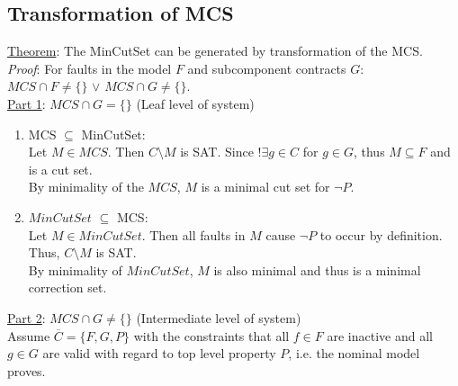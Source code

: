 \subsection{Transformation of MCS} 


\underline{Theorem}: The MinCutSet can be generated by transformation of the MCS.\\


\textit{Proof}: For faults in the model $F$ and subcomponent contracts $G$:\\ $MCS \cap F \neq \{\}$ $\lor$ $MCS \cap G \neq \{\}$.\\

\underline{Part 1}: $MCS \cap G = \{\}$ (Leaf level of system)\\
\begin{enumerate}[label=(\roman*)]

\item MCS $\subseteq$ MinCutSet: \\

Let $M \in  MCS$. Then $C\setminus M$ is SAT. Since $!\exists g \in C$ for $g \in G$, thus $M \subseteq F$ and is a cut set.  \\

By minimality of the $MCS$, $M$ is a minimal cut set for $ \neg P $.  \\

\item $MinCutSet $ $\subseteq$ MCS: \\

Let $M \in MinCutSet$. Then all faults in $M$ cause $ \neg P $ to occur by definition. Thus, $C\setminus M$ is SAT.  \\

By minimality of $MinCutSet$, $M$ is also minimal and thus is a minimal correction set.\\

\end{enumerate}

\underline{Part 2}: $MCS \cap G \neq \{\}$ (Intermediate level of system)\\

Assume $\overline{C} = \{F,G,P\}$ with the constraints that all $f \in F$ are inactive and all $g\in G$ are valid with regard to top level property $P$, i.e. the nominal model proves. \\

